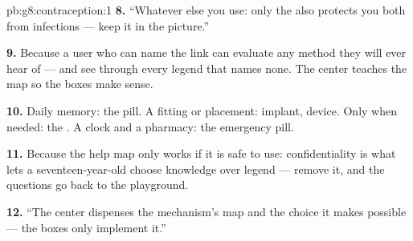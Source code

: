 \begin{solution}{pb:g8:contraception:1}
\textbf{8.} ``Whatever else you use: only the  also
protects you both from infections --- keep it in the
picture.''

\textbf{9.} Because a user who can name the link can
evaluate any method they will ever hear of --- and see
through every legend that names none. The center teaches
the map so the boxes make sense.

\textbf{10.} Daily memory: the pill. A fitting or
placement: implant, device. Only when needed: the .
A clock and a pharmacy: the emergency pill.

\textbf{11.} Because the help map only works if it is
safe to use: confidentiality is what lets a
seventeen-year-old choose knowledge over legend ---
remove it, and the questions go back to the playground.

\textbf{12.} ``The center dispenses the mechanism's map
and the choice it makes possible --- the boxes only
implement it.''
\end{solution}
